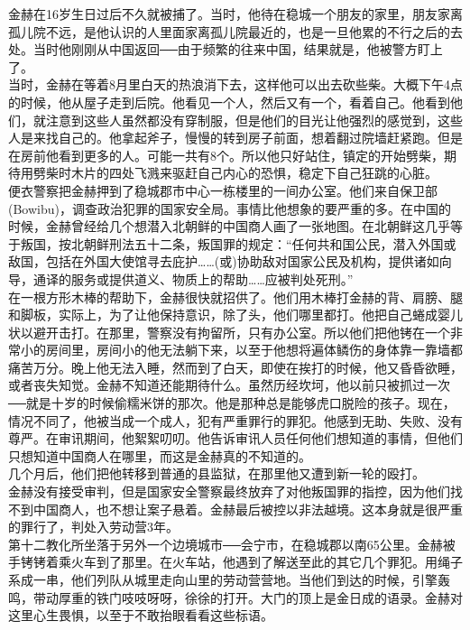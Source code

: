金赫在16岁生日过后不久就被捕了。当时，他待在稳城一个朋友的家里，朋友家离孤儿院不远，是他认识的人里面家离孤儿院最近的，也是一旦他累的不行之后的去处。当时他刚刚从中国返回──由于频繁的往来中国，结果就是，他被警方盯上了。\\

当时，金赫在等着8月里白天的热浪消下去，这样他可以出去砍些柴。大概下午4点的时候，他从屋子走到后院。他看见一个人，然后又有一个，看着自己。他看到他们，就注意到这些人虽然都没有穿制服，但是他们的目光让他强烈的感觉到，这些人是来找自己的。他拿起斧子，慢慢的转到房子前面，想着翻过院墙赶紧跑。但是在房前他看到更多的人。可能一共有8个。所以他只好站住，镇定的开始劈柴，期待用劈柴时木片的四处飞溅来驱赶自己内心的恐惧，稳定下自己狂跳的心脏。\\

便衣警察把金赫押到了稳城郡市中心一栋楼里的一间办公室。他们来自保卫部(Bowibu)，调查政治犯罪的国家安全局。事情比他想象的要严重的多。在中国的时候，金赫曾经给几个想潜入北朝鲜的中国商人画了一张地图。在北朝鲜这几乎等于叛国，按北朝鲜刑法五十二条，叛国罪的规定：“任何共和国公民，潜入外国或敌国，包括在外国大使馆寻去庇护……(或)协助敌对国家公民及机构，提供诸如向导，通译的服务或提供道义、物质上的帮助……应被判处死刑。”\\

在一根方形木棒的帮助下，金赫很快就招供了。他们用木棒打金赫的背、肩膀、腿和脚板，实际上，为了让他保持意识，除了头，他们哪里都打。他把自己蜷成婴儿状以避开击打。在那里，警察没有拘留所，只有办公室。所以他们把他铐在一个非常小的房间里，房间小的他无法躺下来，以至于他想将遍体鳞伤的身体靠一靠墙都痛苦万分。晚上他无法入睡，然而到了白天，即使在挨打的时候，他又昏昏欲睡，或者丧失知觉。金赫不知道还能期待什么。虽然历经坎坷，他以前只被抓过一次──就是十岁的时候偷糯米饼的那次。他是那种总是能够虎口脱险的孩子。现在，情况不同了，他被当成一个成人，犯有严重罪行的罪犯。他感到无助、失败、没有尊严。在审讯期间，他絮絮叨叨。他告诉审讯人员任何他们想知道的事情，但他们只想知道中国商人在哪里，而这是金赫真的不知道的。\\

几个月后，他们把他转移到普通的县监狱，在那里他又遭到新一轮的殴打。\\

金赫没有接受审判，但是国家安全警察最终放弃了对他叛国罪的指控，因为他们找不到中国商人，也不想让案子悬着。金赫最后被控以非法越境。这本身就是很严重的罪行了，判处入劳动营3年。\\

第十二教化所坐落于另外一个边境城市──会宁市，在稳城郡以南65公里。金赫被手铐铐着乘火车到了那里。在火车站，他遇到了解送至此的其它几个罪犯。用绳子系成一串，他们列队从城里走向山里的劳动营营地。当他们到达的时候，引擎轰鸣，带动厚重的铁门吱吱呀呀，徐徐的打开。大门的顶上是金日成的语录。金赫对这里心生畏惧，以至于不敢抬眼看看这些标语。\\

